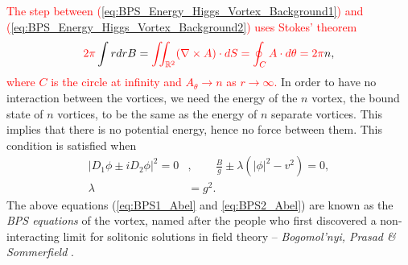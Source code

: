     \textcolor{red}{The step between (\ref{eq:BPS_Energy_Higgs_Vortex_Background1}) and (\ref{eq:BPS_Energy_Higgs_Vortex_Background2}) uses Stokes' theorem}
    \begin{align}
        \textcolor{red}{2\pi} \int r dr B = \textcolor{red}{\iint_{\mathbb{R}^2}( \nabla \times A) \cdot dS = \oint_C A \cdot d\theta = 2\pi } n,
    \end{align}
\textcolor{red}{where $C$ is the circle at infinity and $A_{\theta} \rightarrow n$ as $r \rightarrow \infty$.}
    In order to have no interaction between the vortices, we need the energy of the $n$ vortex, the bound state of $n$ vortices, to be the same as the energy of $n$ separate vortices. This implies that there is no potential energy, hence no force between them. This condition is satisfied when
    \begin{align}
        |D_1\phi \pm i D_2 \phi|^2 =0&,  \qquad \frac{B}{g} \pm \lambda \left(|\phi|^2 -v^2  \right) =0, \label{eq:BPS1_Abel}\\
        \lambda &= g^2 .\label{eq:BPS2_Abel}
    \end{align}
    The above equations (\eqref{eq:BPS1_Abel} and \eqref{eq:BPS2_Abel}) are known as the \textit{BPS equations} of the vortex, named after the people who first discovered a non-interacting limit for solitonic solutions in field theory -- \textit{Bogomol'nyi, Prasad \& Sommerfield} \cite{Bogomolny:1975de} \cite{Prasad:1975kr}.
    


